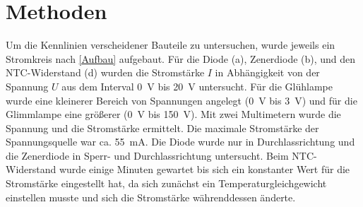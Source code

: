 \documentclass[
	a4paper,
	12pt,
	pagesize,
	ngerman
]{scrartcl}
\begin{document}
	
	\section{Methoden}
	Um die Kennlinien verscheidener Bauteile zu untersuchen, wurde jeweils ein Stromkreis nach \cref{Aufbau} aufgebaut.
	Für die Diode (a), Zenerdiode (b), und den NTC-Widerstand (d) wurden die Stromstärke $I$ in Abhängigkeit von der Spannung $U$ aus dem Interval \SI{0}{V} bis \SI{20}{V} untersucht. 
	Für die Glühlampe wurde eine kleinerer Bereich von Spannungen angelegt (\SI{0}{V} bis \SI{3}{V}) und für die Glimmlampe eine größerer (\SI{0}{V} bis \SI{150}{V}).
	Mit zwei Multimetern wurde die Spannung und die Stromstärke ermittelt.
	Die maximale Stromstärke der Spannungsquelle war ca. \SI{55}{mA}.
	Die Diode wurde nur in Durchlassrichtung und die Zenerdiode in Sperr- und Durchlassrichtung untersucht.
	Beim NTC-Widerstand wurde einige Minuten gewartet bis sich ein konstanter Wert für die Stromstärke eingestellt hat, da sich zunächst ein Temperaturgleichgewicht einstellen musste und sich die Stromstärke währenddessen änderte.
\end{document}
